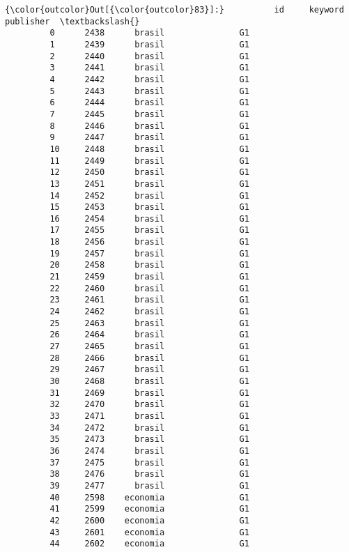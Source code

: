 \documentclass[11pt]{article}
\begin{document}
\begin{Verbatim}[commandchars=\\\{\}]
{\color{outcolor}Out[{\color{outcolor}83}]:}          id     keyword        publisher  \textbackslash{}
         0      2438      brasil               G1   
         1      2439      brasil               G1   
         2      2440      brasil               G1   
         3      2441      brasil               G1   
         4      2442      brasil               G1   
         5      2443      brasil               G1   
         6      2444      brasil               G1   
         7      2445      brasil               G1   
         8      2446      brasil               G1   
         9      2447      brasil               G1   
         10     2448      brasil               G1   
         11     2449      brasil               G1   
         12     2450      brasil               G1   
         13     2451      brasil               G1   
         14     2452      brasil               G1   
         15     2453      brasil               G1   
         16     2454      brasil               G1   
         17     2455      brasil               G1   
         18     2456      brasil               G1   
         19     2457      brasil               G1   
         20     2458      brasil               G1   
         21     2459      brasil               G1   
         22     2460      brasil               G1   
         23     2461      brasil               G1   
         24     2462      brasil               G1   
         25     2463      brasil               G1   
         26     2464      brasil               G1   
         27     2465      brasil               G1   
         28     2466      brasil               G1   
         29     2467      brasil               G1   
         30     2468      brasil               G1   
         31     2469      brasil               G1   
         32     2470      brasil               G1   
         33     2471      brasil               G1   
         34     2472      brasil               G1   
         35     2473      brasil               G1   
         36     2474      brasil               G1   
         37     2475      brasil               G1   
         38     2476      brasil               G1   
         39     2477      brasil               G1   
         40     2598    economia               G1   
         41     2599    economia               G1   
         42     2600    economia               G1   
         43     2601    economia               G1   
         44     2602    economia               G1   

\end{Verbatim}
\end{document}
